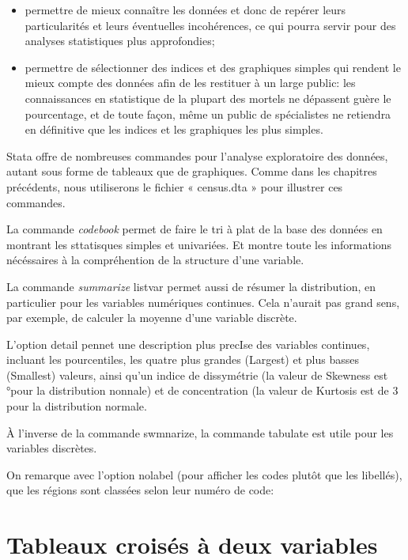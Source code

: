 \documentclass[
]{book}
\providecommand{\tightlist}{%
  \setlength{\itemsep}{0pt}\setlength{\parskip}{0pt}}
\begin{document}
\begin{itemize}
\tightlist
\item
  permettre de mieux connaître les données et donc de repérer
  leurs particularités et leurs éventuelles incohérences, ce qui
  pourra servir pour des analyses statistiques plus
  approfondies;
\item
  permettre de sélectionner des indices et des graphiques
  simples qui rendent le mieux compte des données afin de les
  restituer à un large public: les connaissances en statistique de
  la plupart des mortels ne dépassent guère le pourcentage, et
  de toute façon, même un public de spécialistes ne retiendra en
  définitive que les indices et les graphiques les plus simples.
\end{itemize}

Stata offre de nombreuses commandes pour l'analyse
exploratoire des données, autant sous forme de tableaux que de
graphiques. Comme dans les chapitres précédents, nous
utiliserons le fichier « census.dta » pour illustrer ces
commandes.

La commande \emph{codebook} permet de faire le tri à plat de la base des données en montrant les sttatisques simples et univariées. Et montre toute les informations nécéssaires à la compréhention de la structure d'une variable.

La commande \emph{summarize} listvar permet aussi de résumer
la distribution, en particulier pour les variables numériques
continues. Cela n'aurait pas grand sens, par exemple, de calculer
la moyenne d'une variable discrète.

L'option detail pennet une description plus precIse des
variables continues, incluant les pourcentiles, les quatre plus
grandes (Largest) et plus basses (Smallest) valeurs, ainsi
qu'un indice de dissymétrie (la valeur de Skewness est °pour
la distribution nonnale) et de concentration (la valeur de
Kurtosis est de 3 pour la distribution normale.

À l'inverse de la commande swmnarize, la commande tabulate est utile pour les variables discrètes.

On remarque avec l'option nolabel (pour afficher les codes plutôt que les libellés), que les régions sont classées selon leur numéro de code:

\hypertarget{tableaux-croisuxe9s-uxe0-deux-variables}{%
\section{Tableaux croisés à deux variables}\label{tableaux-croisuxe9s-uxe0-deux-variables}}
\end{document}
